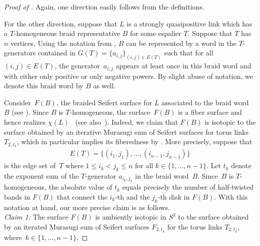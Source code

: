 \documentclass{amsart}
\theoremstyle{definition}
\theoremstyle{remark}
\theoremstyle{plain}
\newcommand{\sigij}{a_{i,j}}
\begin{document}
\begin{proof}[{Proof of }]
Again, one direction easily follows from the definitions. 

For the other direction, suppose that $L$ is a strongly quasipositive link which has a $T$-homogeneous braid representative $B$ for some espalier $T$. Suppose that $T$ has~$n$ vertices. Using the notation from , $B$ can be represented by a word in the $T$-generators contained in $G(T)=\{\sigij\}_{(i,j) \in E(T)}$ such that for all $(i,j) \in E(T)$, the generator~$\sigij$ appears at least once in this braid word and with either only positive or only negative powers. By slight abuse of notation, we denote this braid word by $B$ as well.

Consider~$F(B)$, the braided Seifert surface for $L$  associated to the braid word~$B$ (see ). Since $B$ is $T$-homogeneous, the surface~$F(B)$ is a fiber surface and hence realizes $\chi(L)$~\cite{Rudolph_Hopf_plumbing} (see also~). Indeed, we claim that $F(B)$ is isotopic to the surface obtained by an iterative Murasugi sum of Seifert surfaces for torus links $T_{2,t_k}$, which in particular implies its fiberedness by . More precisely, suppose that 
\begin{align}\label{eq:edges}
E(T)=\{(i_1,j_1), \dots, (i_{n-1},j_{n-1})\}
\end{align}
is the edge set of~$T$ where $1 \leq i_k < j_k \leq  n$ for all $k \in \{1, \dots, n-1\}$. Let $t_k$ denote the exponent sum of the $T$-generator $a_{i_k,j_k}$ in the braid word~$B$. Since~$B$ is $T$-homogeneous, the absolute value of $t_k$ equals precisely the number of half-twisted bands in $F(B)$ that connect the $i_k$-th and the $j_k$-th disk in $F(B)$. With this notation at hand, our more precise claim is as follows.\\

\emph{Claim 1:} The surface $F(B)$ is ambiently isotopic in $S^3$ to the surface obtained by an iterated Murasugi sum of Seifert surfaces $F_{2,t_k}$ for the torus links $T_{2,t_k}$, where~$k \in \{1, \dots, n-1\}$. 


\end{proof}
\end{document}
